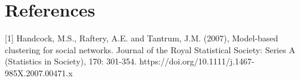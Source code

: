 \documentclass{article}
\begin{document}
\section*{References}

{
\small

[1] Handcock, M.S., Raftery, A.E. and Tantrum, J.M. (2007), Model-based clustering for social networks. Journal of the Royal Statistical Society: Series A (Statistics in Society), 170: 301-354. https://doi.org/10.1111/j.1467-985X.2007.00471.x






}

\end{document}
